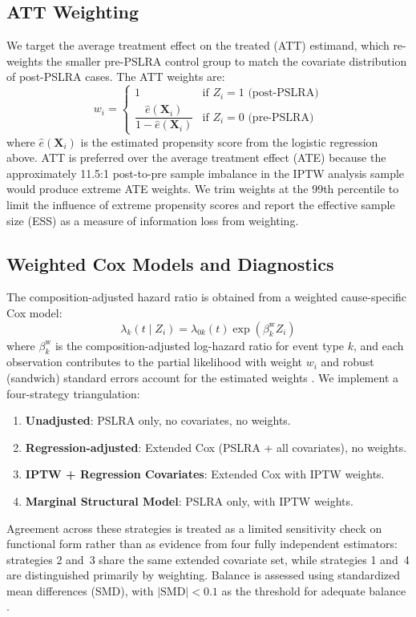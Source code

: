 \subsection{ATT Weighting}

We target the average treatment effect on the treated (ATT)
estimand, which re-weights the smaller pre-PSLRA control group
to match the covariate distribution of post-PSLRA cases. The
ATT weights are:
\begin{equation}
w_i =
\begin{cases}
1 & \text{if } Z_i = 1 \text{ (post-PSLRA)} \\[4pt]
\dfrac{\hat{e}(\mathbf{X}_i)}{1 - \hat{e}(\mathbf{X}_i)} & \text{if } Z_i = 0 \text{ (pre-PSLRA)}
\end{cases}
\end{equation}
where $\hat{e}(\mathbf{X}_i)$ is the estimated propensity score from the logistic regression above.
ATT is preferred over the average treatment effect (ATE)
because the approximately 11.5:1 post-to-pre sample imbalance
in the IPTW analysis sample would produce
extreme ATE weights. We trim weights at the 99th percentile
to limit the influence of extreme propensity scores and report
the effective sample size (ESS) as a measure of information
loss from weighting.

\subsection{Weighted Cox Models and Diagnostics}

The composition-adjusted hazard ratio is obtained from a
weighted cause-specific Cox model:
\begin{equation}
\lambda_k(t \mid Z_i) = \lambda_{0k}(t) \exp(\beta_k^{\text{w}} Z_i)
\end{equation}
where $\beta_k^{\text{w}}$ is the composition-adjusted log-hazard ratio for event type $k$, and each observation contributes to the partial likelihood
with weight $w_i$ and robust (sandwich) standard errors account
for the estimated weights \citep{xieliu2005}. We implement a
four-strategy triangulation:
\begin{enumerate}
    \item \textbf{Unadjusted}: PSLRA only, no covariates, no weights.
    \item \textbf{Regression-adjusted}: Extended Cox (PSLRA + all
    covariates), no weights.
    \item \textbf{IPTW + Regression Covariates}: Extended Cox with IPTW weights.
    \item \textbf{Marginal Structural Model}: PSLRA only, with IPTW weights.
\end{enumerate}
Agreement across these strategies is treated as a limited
sensitivity check on functional form rather than as evidence
from four fully independent estimators: strategies 2 and~3
share the same extended covariate set, while strategies 1
and~4 are distinguished primarily by weighting. Balance is assessed using standardized mean differences
(SMD), with $|\text{SMD}| < 0.1$
as the threshold for adequate balance \citep{austinfine2025}.

